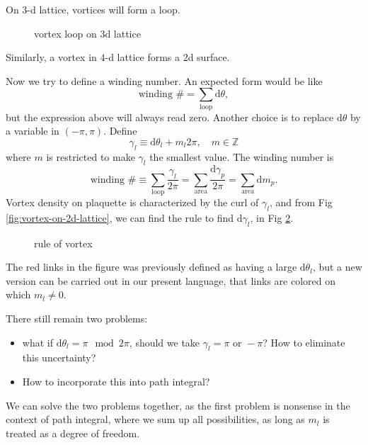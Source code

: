 On $3$-d lattice, vortices will form a loop.
\begin{figure}[h!]
    \centering
    \caption{vortex loop on 3d lattice}
    \label{fig:vortex-loop-on-3d-lattice}
\end{figure}

Similarly, a vortex in $4$-d lattice forms a 2d surface.

Now we try to define a winding number. An expected form would be like
\begin{equation}
  \text{winding }\# = \sum_{\text{loop}} \mathrm{d} \theta,
\end{equation}
but the expression above will always read zero. Another choice is to replace $\mathrm{d} \theta$ by a variable in $(-\pi ,\pi )$. Define
\begin{equation}
  \gamma_{l} \equiv \mathrm{d} \theta_{l} + m_l 2\pi , \quad m \in \mathbb{Z}
\end{equation}
where $m$ is restricted to make $\gamma_{l}$ the smallest value. The winding number is
\begin{equation}
  \text{winding }\# \equiv \sum_{\text{loop}} \frac{\gamma_{l}}{2\pi } = \sum_{\text{area}} \frac{\mathrm{d} \gamma_{p}}{2\pi } = \sum_{\text{area}} \mathrm{d} m_{p}.
\end{equation}
Vortex density on plaquette is characterized by the curl of $\gamma_{l}$, and from Fig \ref{fig:vortex-on-2d-lattice}, we can find the rule to find $\mathrm{d} \gamma_{l}$, in Fig \ref{fig:rule-of-vortex}.
\begin{figure}[ht]
    \centering
    \caption{rule of vortex}
    \label{fig:rule-of-vortex}
\end{figure}
The red links in the figure was previously defined as having a large $\mathrm{d} \theta_{l}$, but a new version can be carried out in our present language, that links are colored on which $m_l \neq 0$.

There still remain two problems:
\begin{itemize}
  \item what if $\mathrm{d} \theta_{l} = \pi \mod 2\pi $, should we take $\gamma_{l} = \pi \text{ or } -\pi $? How to eliminate this uncertainty?
  \item How to incorporate this into path integral?
\end{itemize}
We can solve the two problems together, as the first problem is nonsense in the context of path integral, where we sum up all possibilities, as long as $m_l$ is treated as a degree of freedom.

